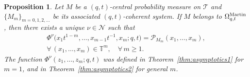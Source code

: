\documentclass[pdftex]{sigma}
\numberwithin{equation}{section}
\newtheorem{prop}[thm]{Proposition}
\newcommand{\Nu}{\mathcal{N}}
\newcommand{\TT}{\mathbb{T}}
\newcommand{\Tau}{\mathcal{T}}
\begin{document}
\begin{prop}\label{prop:PhiProb}
Let $M$ be a $(q, t)$-central probability measure on $\Tau$ and $\{M_m\}_{m = 0, 1, 2, \dots}$ be its associated $(q, t)$-coherent system. If $M$ belongs to $\Omega_{q, t}^{{\rm Martin}}$, then there exists a unique $\nu\in\Nu$ such that
\begin{gather}
\Phi^{\nu}\big(x_1t^{1-m}, \dots, x_{m-1}t^{-1}, x_m; q, t\big) = \mathcal{P}_{M_m}(x_1, \dots, x_m), \nonumber\\
 \forall\, (x_1, \dots, x_m) \in \TT^m, \quad \forall\, m\geq 1.\label{eqn:macdonaldPhi}
\end{gather}
The function $\Phi^{\nu}(z_1, \dots, z_m; q, t)$ was defined in Theorem~{\rm \ref{thm:asymptotics1}} for $m = 1$, and in Theorem~{\rm \ref{thm:asymptotics2}} for general $m$.
\end{prop}
\end{document}

